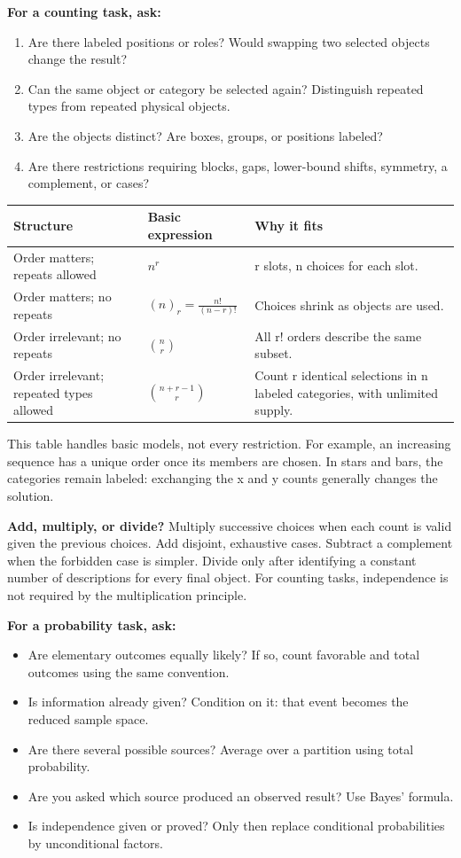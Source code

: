 \documentclass[11pt]{article}
\begin{document}
\textbf{For a counting task, ask:}
\begin{enumerate}
\item Are there labeled positions or roles? Would swapping two selected objects change the result?
\item Can the same object or category be selected again? Distinguish repeated types from repeated physical objects.
\item Are the objects distinct? Are boxes, groups, or positions labeled?
\item Are there restrictions requiring blocks, gaps, lower-bound shifts, symmetry, a complement, or cases?
\end{enumerate}
\begin{center}
\renewcommand{\arraystretch}{1.4}
\begin{tabular}{p{1.55in}p{1.25in}p{2.8in}}
\toprule
Structure & Basic expression & Why it fits\\\midrule
Order matters; repeats allowed & \(n^r\) & r slots, n choices for each slot.\\
Order matters; no repeats & \((n)_r=\frac{n!}{(n-r)!}\) & Choices shrink as objects are used.\\
Order irrelevant; no repeats & \(\binom nr\) & All r! orders describe the same subset.\\
Order irrelevant; repeated types allowed & \(\binom{n+r-1}{r}\) & Count r identical selections in n labeled categories, with unlimited supply.\\\bottomrule
\end{tabular}
\end{center}
This table handles basic models, not every restriction. For example, an increasing sequence has a unique order once its members are chosen. In stars and bars, the categories remain labeled: exchanging the x and y counts generally changes the solution.

\textbf{Add, multiply, or divide?} Multiply successive choices when each count is valid given the previous choices. Add disjoint, exhaustive cases. Subtract a complement when the forbidden case is simpler. Divide only after identifying a constant number of descriptions for every final object. For counting tasks, independence is not required by the multiplication principle.

\textbf{For a probability task, ask:}
\begin{itemize}
\item Are elementary outcomes equally likely? If so, count favorable and total outcomes using the same convention.
\item Is information already given? Condition on it: that event becomes the reduced sample space.
\item Are there several possible sources? Average over a partition using total probability.
\item Are you asked which source produced an observed result? Use Bayes' formula.
\item Is independence given or proved? Only then replace conditional probabilities by unconditional factors.
\end{itemize}
\clearpage
\end{document}
